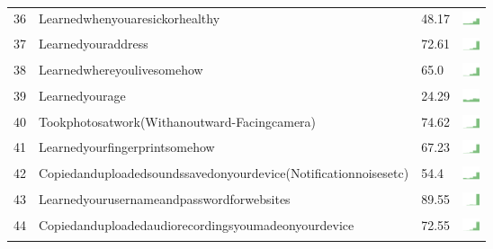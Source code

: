 \begin{table}[t]
\begin{center}
\begin{tabular}{| p{0.5cm} | p{7cm} | p{1cm} | c |}
36 & Learnedwhenyouaresickorhealthy & 48.17 & \includegraphics[width = 0.5cm, height = 0.5cm]{../learnedwhenyouaresickorhealthycombined} \\ 
37 & Learnedyouraddress & 72.61 & \includegraphics[width = 0.5cm, height = 0.5cm]{../learnedyouraddresscombined} \\ 
38 & Learnedwhereyoulivesomehow & 65.0 & \includegraphics[width = 0.5cm, height = 0.5cm]{../learnedwhereyoulivesomehowcombined} \\ 
39 & Learnedyourage & 24.29 & \includegraphics[width = 0.5cm, height = 0.5cm]{../learnedyouragecombined} \\ 
40 & Tookphotosatwork(Withanoutward-Facingcamera) & 74.62 & \includegraphics[width = 0.5cm, height = 0.5cm]{../tookphotosatwork(withanoutward-facingcamera)combined} \\ 
41 & Learnedyourfingerprintsomehow & 67.23 & \includegraphics[width = 0.5cm, height = 0.5cm]{../learnedyourfingerprintsomehowcombined} \\ 
42 & Copiedanduploadedsoundssavedonyourdevice(Notificationnoisesetc) & 54.4 & \includegraphics[width = 0.5cm, height = 0.5cm]{../copiedanduploadedsoundssavedonyourdevice(notificationnoisesetc)combined} \\ 
43 & Learnedyourusernameandpasswordforwebsites & 89.55 & \includegraphics[width = 0.5cm, height = 0.5cm]{../learnedyourusernameandpasswordforwebsitescombined} \\ 
44 & Copiedanduploadedaudiorecordingsyoumadeonyourdevice & 72.55 & \includegraphics[width = 0.5cm, height = 0.5cm]{../copiedanduploadedaudiorecordingsyoumadeonyourdevicecombined} \\ 

\end{tabular}
\end{center}
\end{table}
